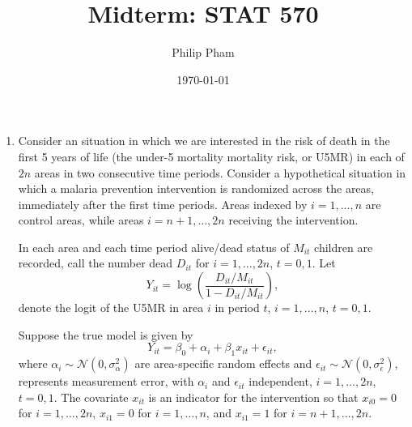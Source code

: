 \documentclass[letterpaper,11pt]{article}
\title{Midterm: STAT 570}
\author{Philip Pham}
\date{\today}
\begin{document}
\maketitle
\begin{enumerate}
\item Consider an situation in which we are interested in the risk of death in
  the first 5 years of life (the under-5 mortality mortality risk, or U5MR) in
  each of $2n$ areas in two consecutive time periods. Consider a hypothetical
  situation in which a malaria prevention intervention is randomized across the
  areas, immediately after the first time periods. Areas indexed by
  $i = 1,\ldots,n$ are control areas, while areas $i = n + 1,\ldots,2n$
  receiving the intervention.

  In each area and each time period alive/dead status of $M_{it}$ children are
  recorded, call the number dead $D_{it}$ for $i = 1,\ldots,2n$, $t = 0, 1$. Let
  \begin{equation}
    Y_{it} = \log\left(\frac{D_{it}/M_{it}}{1 - D_{it}/M_{it}}\right),
    \label{eqn:p1_logit}
  \end{equation}
  denote the logit of the U5MR in area $i$ in period $t$, $i = 1,\ldots,n$,
  $t = 0, 1$.

  Suppose the true model is given by
  \begin{equation}
    Y_{it} = \beta_0 + \alpha_i + \beta_1x_{it} + \epsilon_{it},
  \end{equation}
  where $\alpha_i \sim \mathcal{N}\left(0, \sigma^2_\alpha\right)$ are
  area-specific random effects and
  $\epsilon_{it} \sim \mathcal{N}\left(0, \sigma_\epsilon^2\right)$, represents
  measurement error, with $\alpha_i$ and $\epsilon_{it}$ independent,
  $i = 1,\ldots,2n$, $t = 0, 1$. The covariate $x_{it}$ is an indicator for the
  intervention so that $x_{i0} = 0$ for $i = 1,\ldots,2n$, $x_{i1} = 0$ for
  $i = 1,\ldots,n$, and $x_{i1} = 1$ for $i = n + 1,\ldots,2n$.


\end{enumerate}
\end{document}
